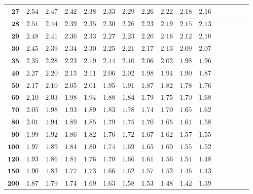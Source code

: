 \begin{longtable}{|r|r|r|r|r|r|r|r|r|r|r|r|r|r|r|r|}
    \(\mathbf{27}\) & \(2.54\) & \(2.47\) & \(2.42\) & \(2.38\) & \(2.33\) & \(2.29\) & \(2.26\) & \(2.22\) & \(2.18\) & \(2.16\) \\  \hline 
    \(\mathbf{28}\) & \(2.51\) & \(2.44\) & \(2.39\) & \(2.35\) & \(2.30\) & \(2.26\) & \(2.23\) & \(2.19\) & \(2.15\) & \(2.13\) \\  \hline 
    \(\mathbf{29}\) & \(2.48\) & \(2.41\) & \(2.36\) & \(2.33\) & \(2.27\) & \(2.23\) & \(2.20\) & \(2.16\) & \(2.12\) & \(2.10\) \\  \hline 
    \(\mathbf{30}\) & \(2.45\) & \(2.39\) & \(2.34\) & \(2.30\) & \(2.25\) & \(2.21\) & \(2.17\) & \(2.13\) & \(2.09\) & \(2.07\) \\  \hline 
    \(\mathbf{35}\) & \(2.35\) & \(2.28\) & \(2.23\) & \(2.19\) & \(2.14\) & \(2.10\) & \(2.06\) & \(2.02\) & \(1.98\) & \(1.96\) \\  \hline 
    \(\mathbf{40}\) & \(2.27\) & \(2.20\) & \(2.15\) & \(2.11\) & \(2.06\) & \(2.02\) & \(1.98\) & \(1.94\) & \(1.90\) & \(1.87\) \\  \hline 
    \(\mathbf{50}\) & \(2.17\) & \(2.10\) & \(2.05\) & \(2.01\) & \(1.95\) & \(1.91\) & \(1.87\) & \(1.82\) & \(1.78\) & \(1.76\) \\  \hline 
    \(\mathbf{60}\) & \(2.10\) & \(2.03\) & \(1.98\) & \(1.94\) & \(1.88\) & \(1.84\) & \(1.79\) & \(1.75\) & \(1.70\) & \(1.68\) \\  \hline 
    \(\mathbf{70}\) & \(2.05\) & \(1.98\) & \(1.93\) & \(1.89\) & \(1.83\) & \(1.78\) & \(1.74\) & \(1.70\) & \(1.65\) & \(1.62\) \\  \hline 
    \(\mathbf{80}\) & \(2.01\) & \(1.94\) & \(1.89\) & \(1.85\) & \(1.79\) & \(1.75\) & \(1.70\) & \(1.65\) & \(1.61\) & \(1.58\) \\  \hline 
    \(\mathbf{90}\) & \(1.99\) & \(1.92\) & \(1.86\) & \(1.82\) & \(1.76\) & \(1.72\) & \(1.67\) & \(1.62\) & \(1.57\) & \(1.55\) \\  \hline 
    \(\mathbf{100}\) & \(1.97\) & \(1.89\) & \(1.84\) & \(1.80\) & \(1.74\) & \(1.69\) & \(1.65\) & \(1.60\) & \(1.55\) & \(1.52\) \\  \hline 
    \(\mathbf{120}\) & \(1.93\) & \(1.86\) & \(1.81\) & \(1.76\) & \(1.70\) & \(1.66\) & \(1.61\) & \(1.56\) & \(1.51\) & \(1.48\) \\  \hline 
    \(\mathbf{150}\) & \(1.90\) & \(1.83\) & \(1.77\) & \(1.73\) & \(1.66\) & \(1.62\) & \(1.57\) & \(1.52\) & \(1.46\) & \(1.43\) \\  \hline 
    \(\mathbf{200}\) & \(1.87\) & \(1.79\) & \(1.74\) & \(1.69\) & \(1.63\) & \(1.58\) & \(1.53\) & \(1.48\) & \(1.42\) & \(1.39\) \\  \hline 

\end{longtable}
